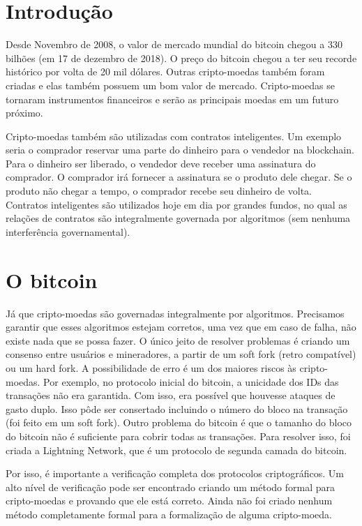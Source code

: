 \documentclass[12pt]{report}
\begin{document}
\section{Introdução}

Desde Novembro de 2008, o valor de mercado mundial do bitcoin chegou a 330 bilhões (em 17 de dezembro de 2018). O preço do bitcoin chegou a ter seu recorde histórico por volta de 20 mil dólares. Outras cripto-moedas também foram criadas e elas também possuem um bom valor de mercado. Cripto-moedas se tornaram instrumentos financeiros e serão as principais moedas em um futuro próximo.

Cripto-moedas também são utilizadas com contratos inteligentes. Um exemplo seria o comprador reservar uma parte do dinheiro para o vendedor na blockchain. Para o dinheiro ser liberado, o vendedor deve receber uma assinatura do comprador. O comprador irá fornecer a assinatura se o produto dele chegar. Se o produto não chegar a tempo, o comprador recebe seu dinheiro de volta. Contratos inteligentes são utilizados hoje em dia por grandes fundos, no qual as relações de contratos são integralmente governada por algoritmos (sem nenhuma interferência governamental).

\section{O bitcoin}

Já que cripto-moedas são governadas integralmente por algoritmos.
Precisamos garantir que esses algoritmos estejam corretos, uma vez que em caso de falha,
não existe nada que se possa fazer.
O único jeito de resolver problemas é criando um consenso entre usuários e mineradores,
a partir de um soft fork (retro compatível) ou um hard fork.
A possibilidade de erro é um dos maiores riscos às cripto-moedas.
Por exemplo, no protocolo inicial do bitcoin, a unicidade dos IDs das transações não era garantida.
Com isso, era possível que houvesse ataques de gasto duplo.
Isso pôde ser consertado incluindo o número do bloco na transação (foi feito em um soft fork).
Outro problema do bitcoin é que o tamanho do bloco do bitcoin não é suficiente para cobrir todas as transações.
Para resolver isso, foi criada a Lightning Network, que é um protocolo de segunda camada do bitcoin.

Por isso, é importante a verificação completa dos protocolos criptográficos.
Um alto nível de verificação pode ser encontrado criando um método formal para cripto-moedas e provando que ele está correto.
Ainda não foi criado nenhum método completamente formal para a formalização de alguma cripto-moeda.
\end{document}
